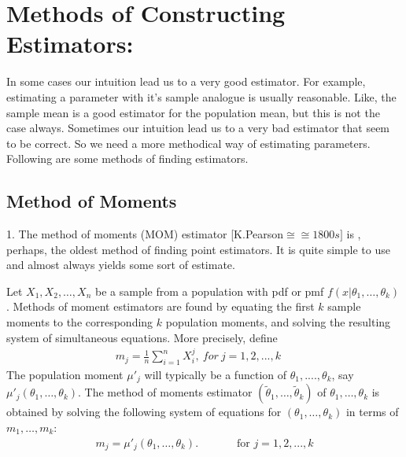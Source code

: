 \section {Methods of Constructing   Estimators: }
In some cases our intuition lead us to a very good estimator. For example, estimating a parameter with it's sample analogue is usually reasonable. Like, the sample mean is a good estimator for the population mean, but this is not the case always. Sometimes our intuition lead us to a very bad estimator that seem to be correct. So we need a more methodical way of estimating parameters. Following are some methods of finding estimators.
\subsection {Method of Moments}
1. The method of moments (MOM) estimator [K.Pearson$\cong\cong1800s]$ is , perhaps, the oldest method of finding point estimators. It is quite simple to use and almost always yields some sort of estimate.
\par Let $X_1,X_2,\dots,X_n$ be a sample from a population with pdf or pmf $f(x|\theta_1,\dots,\theta_k)$. Methods of moment estimators are found by equating the first $k$ sample moments to the corresponding $k$ population moments, and solving the resulting system of simultaneous equations. More precisely, define
\begin{align}
 m_j = \frac{1}{n}\sum\limits_{i=1}^n{X^j_i},\ for \ j = 1,2,...,k \,\,\,\,\,\,\,%
\end{align}  
The population moment $\mu'_j$ will typically be a function of $\theta_1,....,\theta_k$, say $\mu'_j(\theta_1,\dots,\theta_k)$. The method of moments estimator $(\tilde\theta_1,\dots,\tilde\theta_k)$ of $\theta_1,\dots,\theta_k$ is obtained by solving the following system of equations for $(\theta_1,\dots,\theta_k)$ in terms of $m_1,\dots,m_k$:
\begin{align}
m_j = \mu'_j(\theta_1,\dots,\theta_k). \,\,\,\,\,\,\,\,\,\,\,\,\,\,\,\,\,\,\,\,\,\mathrm{for}\,\, j = 1,2,...,k
\end{align} 
